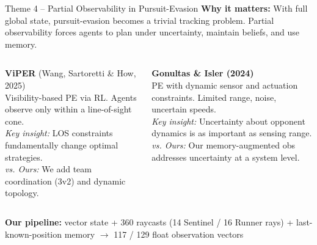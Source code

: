 \documentclass[aspectratio=169,11pt]{beamer}
\begin{document}
\begin{frame}{Theme 4 -- Partial Observability in Pursuit-Evasion}
\textbf{Why it matters:} With full global state, pursuit-evasion becomes a trivial tracking problem. Partial observability forces agents to plan under uncertainty, maintain beliefs, and use memory.

\vspace{6pt}
\begin{columns}[T]
\textbf{ViPER} {\small(Wang, Sartoretti \& How, 2025)}\\
Visibility-based PE via RL. Agents observe only within a line-of-sight cone.\\[3pt]
\textit{Key insight:} LOS constraints fundamentally change optimal strategies.\\[3pt]
{\small\textit{vs. Ours:} We add team coordination (3v2) and dynamic topology.}

\textbf{Gonultas \& Isler (2024)}\\
PE with dynamic sensor and actuation constraints. Limited range, noise, uncertain speeds.\\[3pt]
\textit{Key insight:} Uncertainty about opponent dynamics is as important as sensing range.\\[3pt]
{\small\textit{vs. Ours:} Our memory-augmented obs addresses uncertainty at a system level.}
\end{columns}

\vspace{6pt}
\begin{center}
{\small\textbf{Our pipeline:} vector state + 360\textdegree{} raycasts (14 Sentinel / 16 Runner rays) + last-known-position memory $\rightarrow$ 117 / 129 float observation vectors}
\end{center}
\end{frame}
\end{document}
